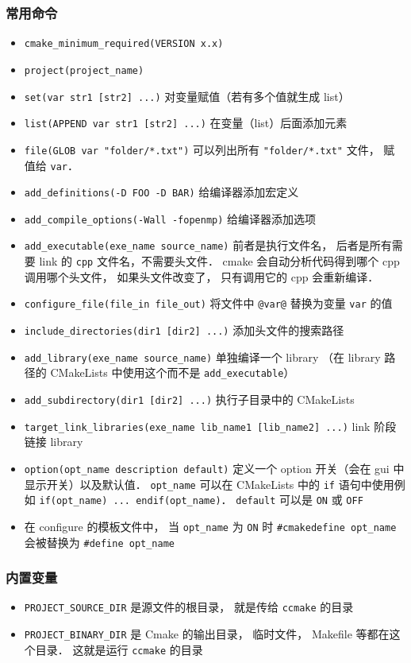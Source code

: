 \subsubsection{常用命令}
\begin{itemize}
\item \verb`cmake_minimum_required(VERSION x.x)`
\item \verb`project(project_name)`
\item \verb`set(var str1 [str2] ...)` 对变量赋值（若有多个值就生成 list）
\item \verb`list(APPEND var str1 [str2] ...)` 在变量（list）后面添加元素
\item \verb`file(GLOB var "folder/*.txt")` 可以列出所有 \verb|"folder/*.txt"| 文件， 赋值给 \verb|var|．
\item \verb|add_definitions(-D FOO -D BAR)| 给编译器添加宏定义
\item \verb|add_compile_options(-Wall -fopenmp)| 给编译器添加选项
\item \verb`add_executable(exe_name source_name)` 前者是执行文件名， 后者是所有需要 link 的 \verb|cpp| 文件名，不需要头文件． cmake 会自动分析代码得到哪个 cpp 调用哪个头文件， 如果头文件改变了， 只有调用它的 cpp 会重新编译．
\item \verb`configure_file(file_in file_out)` 将文件中 \verb`@var@` 替换为变量 \verb`var` 的值
\item \verb`include_directories(dir1 [dir2] ...)` 添加头文件的搜索路径
\item \verb`add_library(exe_name source_name)` 单独编译一个 library （在 library 路径的 CMakeLists 中使用这个而不是 \verb`add_executable`）
\item \verb`add_subdirectory(dir1 [dir2] ...)` 执行子目录中的 CMakeLists
\item \verb`target_link_libraries(exe_name lib_name1 [lib_name2] ...)` link 阶段链接 library
\item \verb`option(opt_name description default)` 定义一个 option 开关（会在 gui 中显示开关）以及默认值． \verb`opt_name` 可以在 CMakeLists 中的 \verb`if` 语句中使用例如 \verb`if(opt_name) ... endif(opt_name)`． \verb`default` 可以是 \verb`ON` 或 \verb`OFF`
\item 在 configure 的模板文件中， 当 \verb`opt_name` 为 \verb`ON` 时 \verb`#cmakedefine opt_name` 会被替换为 \verb`#define opt_name`
\end{itemize}

\subsubsection{内置变量}
\begin{itemize}
\item \verb`PROJECT_SOURCE_DIR` 是源文件的根目录， 就是传给 \verb`ccmake` 的目录
\item \verb`PROJECT_BINARY_DIR` 是 Cmake 的输出目录， 临时文件， Makefile 等都在这个目录． 这就是运行 \verb`ccmake` 的目录
\end{itemize}

